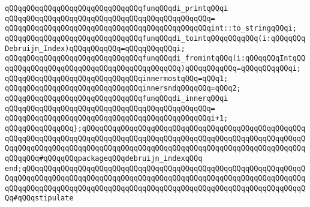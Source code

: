 \newline
\verb|qQQqqQQqqQQqqQQqqQQqqQQqqQQqqQQqfunqQQqdi_printqQQqi|\newline
\verb|qQQqqQQqqQQqqQQqqQQqqQQqqQQqqQQqqQQqqQQqqQQqqQQq=|\newline
\verb|qQQqqQQqqQQqqQQqqQQqqQQqqQQqqQQqqQQqqQQqqQQqqQQqint::to_stringqQQqi;|\newline
\newline
\verb|qQQqqQQqqQQqqQQqqQQqqQQqqQQqqQQqfunqQQqdi_tointqQQqqQQqqQQq(i:qQQqqQQqDebruijn_Index)qQQqqQQqqQQq=qQQqqQQqqQQqi;|\newline
\verb|qQQqqQQqqQQqqQQqqQQqqQQqqQQqqQQqfunqQQqdi_fromintqQQq(i:qQQqqQQqIntqQQqqQQqqQQqqQQqqQQqqQQqqQQqqQQqqQQqqQQqqQQq)qQQqqQQqqQQq=qQQqqQQqqQQqi;|\newline
\newline
\verb|qQQqqQQqqQQqqQQqqQQqqQQqqQQqqQQqinnermostqQQq=qQQq1;|\newline
\verb|qQQqqQQqqQQqqQQqqQQqqQQqqQQqqQQqinnersndqQQqqQQq=qQQq2;|\newline
\newline
\verb|qQQqqQQqqQQqqQQqqQQqqQQqqQQqqQQqfunqQQqdi_innerqQQqi|\newline
\verb|qQQqqQQqqQQqqQQqqQQqqQQqqQQqqQQqqQQqqQQqqQQqqQQq=|\newline
\verb|qQQqqQQqqQQqqQQqqQQqqQQqqQQqqQQqqQQqqQQqqQQqqQQqi+1;|\newline
\newline
\newline
\verb|qQQqqQQqqQQqqQQq};qQQqqQQqqQQqqQQqqQQqqQQqqQQqqQQqqQQqqQQqqQQqqQQqqQQqqQQqqQQqqQQqqQQqqQQqqQQqqQQqqQQqqQQqqQQqqQQqqQQqqQQqqQQqqQQqqQQqqQQqqQQqqQQqqQQqqQQqqQQqqQQqqQQqqQQqqQQqqQQqqQQqqQQqqQQqqQQqqQQqqQQqqQQqqQQqqQQqqQQq#qQQqqQQqpackageqQQqdebruijn_indexqQQq|\newline
\verb|end;qQQqqQQqqQQqqQQqqQQqqQQqqQQqqQQqqQQqqQQqqQQqqQQqqQQqqQQqqQQqqQQqqQQqqQQqqQQqqQQqqQQqqQQqqQQqqQQqqQQqqQQqqQQqqQQqqQQqqQQqqQQqqQQqqQQqqQQqqQQqqQQqqQQqqQQqqQQqqQQqqQQqqQQqqQQqqQQqqQQqqQQqqQQqqQQqqQQqqQQqqQQqqQQq#qQQqstipulate|\newline
\newline
\newline
\newline

